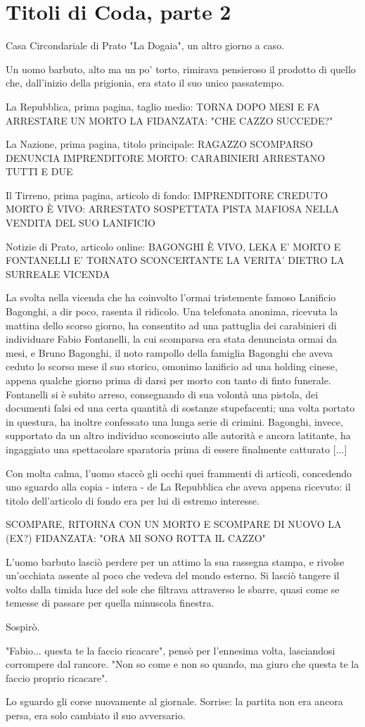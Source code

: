 \chapter{Titoli di Coda, parte 2}

Casa Circondariale di Prato "La Dogaia", un altro giorno a caso.

Un uomo barbuto, alto ma un po' torto, rimirava pensieroso il prodotto di quello che, dall'inizio della prigionia, era stato il suo unico passatempo.

La Repubblica, prima pagina, taglio medio:
TORNA DOPO MESI E FA ARRESTARE UN MORTO
LA FIDANZATA: "CHE CAZZO SUCCEDE?"

La Nazione, prima pagina, titolo principale:
RAGAZZO SCOMPARSO DENUNCIA IMPRENDITORE MORTO: 
CARABINIERI ARRESTANO TUTTI E DUE

Il Tirreno, prima pagina, articolo di fondo:
IMPRENDITORE CREDUTO MORTO È VIVO: ARRESTATO
SOSPETTATA PISTA MAFIOSA NELLA VENDITA DEL SUO LANIFICIO

Notizie di Prato, articolo online:
BAGONGHI È VIVO, LEKA E' MORTO E FONTANELLI E' TORNATO
SCONCERTANTE LA VERITA' DIETRO LA SURREALE VICENDA

La svolta nella vicenda che ha coinvolto l'ormai tristemente famoso Lanificio Bagonghi, a dir poco, rasenta il ridicolo. Una telefonata anonima, ricevuta la mattina dello scorso giorno, ha consentito ad una pattuglia dei carabinieri di individuare Fabio Fontanelli, la cui scomparsa era stata denunciata ormai da mesi, e Bruno Bagonghi, il noto rampollo della famiglia Bagonghi che aveva ceduto lo scorso mese il suo storico, omonimo lanificio ad una holding cinese, appena qualche giorno prima di darsi per morto con tanto di finto funerale. Fontanelli si è subito arreso, consegnando di sua volontà una pistola, dei documenti falsi ed una certa quantità di sostanze stupefacenti; una volta portato in questura, ha inoltre confessato una lunga serie di crimini. Bagonghi, invece, supportato da un altro individuo sconosciuto alle autorità e ancora latitante, ha ingaggiato una spettacolare sparatoria prima di essere finalmente catturato [...]

Con molta calma, l'uomo staccò gli occhi quei frammenti di articoli, concedendo uno sguardo alla copia - intera - de La Repubblica che aveva appena ricevuto: il titolo dell'articolo di fondo era per lui di estremo interesse.

SCOMPARE, RITORNA CON UN MORTO E SCOMPARE DI NUOVO
LA (EX?) FIDANZATA: "ORA MI SONO ROTTA IL CAZZO"

L'uomo barbuto lasciò perdere per un attimo la sua rassegna stampa, e rivolse un'occhiata assente al poco che vedeva del mondo esterno. Si lasciò tangere il volto dalla timida luce del sole che filtrava attraverso le sbarre, quasi come se temesse di passare per quella minuscola finestra. 

Sospirò.

"Fabio... questa te la faccio ricacare", pensò per l'ennesima volta, lasciandosi corrompere dal rancore. "Non so come e non so quando, ma giuro che questa te la faccio proprio ricacare".

Lo sguardo gli corse nuovamente al giornale. Sorrise: la partita non era ancora persa, era solo cambiato il suo avversario.
